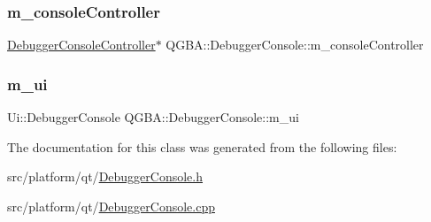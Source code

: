 \subsubsection{\texorpdfstring{m\+\_\+console\+Controller}{m\_consoleController}}
{\footnotesize\ttfamily \mbox{\hyperlink{class_q_g_b_a_1_1_debugger_console_controller}{Debugger\+Console\+Controller}}$\ast$ Q\+G\+B\+A\+::\+Debugger\+Console\+::m\+\_\+console\+Controller\hspace{0.3cm}{\ttfamily [private]}}

\mbox{\label{class_q_g_b_a_1_1_debugger_console_a0f2bd4c41069b346a22829e118e53570}} 
\subsubsection{\texorpdfstring{m\+\_\+ui}{m\_ui}}
{\footnotesize\ttfamily Ui\+::\+Debugger\+Console Q\+G\+B\+A\+::\+Debugger\+Console\+::m\+\_\+ui\hspace{0.3cm}{\ttfamily [private]}}



The documentation for this class was generated from the following files\+:\begin{DoxyCompactItemize}
\item 
src/platform/qt/\mbox{\hyperlink{_debugger_console_8h}{Debugger\+Console.\+h}}\item 
src/platform/qt/\mbox{\hyperlink{_debugger_console_8cpp}{Debugger\+Console.\+cpp}}\end{DoxyCompactItemize}
